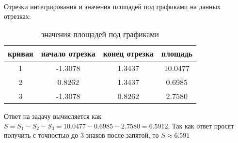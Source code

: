 \documentclass[a4paper,12pt,titlepage,finall]{article}
\begin{document}
Отрезки интегрирования и значения площадей под графиками на данных отрезках:

\begin{table}[h]
    \centering
    \begin{tabular}{|c|c|c|c|}
    \hline
         кривая & начало отрезка & конец отрезка & площадь\\
         \hline
         1 & -1.3078 & 1.3437 & 10.0477\\
         2 & 0.8262 & 1.3437 & 0.6985\\
         3 & -1.3078 & 0.8262 & 2.7580\\
         \hline
    \end{tabular}
    \caption{значения площадей под графиками}
    \label{table2}
\end{table}

Ответ на задачу вычисляется как $S = S_1 - S_2 - S_3 = 10.0477 - 0.6985 - 2.7580 = 6.5912$. Так как ответ просят получить с точностью до 3 знаков после запятой, то $S \approx 6.591$
\end{document}
